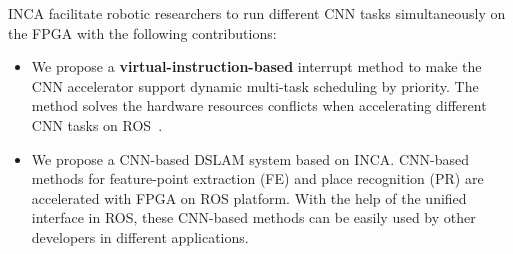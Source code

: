 

INCA facilitate robotic researchers to run different CNN tasks simultaneously on the FPGA with the following contributions:
\begin{itemize}
\item We propose a \textbf{virtual-instruction-based} interrupt method to make the CNN accelerator support dynamic multi-task scheduling by priority. The method solves the hardware resources conflicts when accelerating different CNN tasks on ROS~\cite{quigley2009ros}.
\item We propose a CNN-based DSLAM system based on INCA. CNN-based methods for feature-point extraction (FE) and place recognition (PR) are accelerated with FPGA on ROS platform. With the help of the unified interface in ROS, these CNN-based methods can be easily used by other developers in different applications.
\end{itemize}

